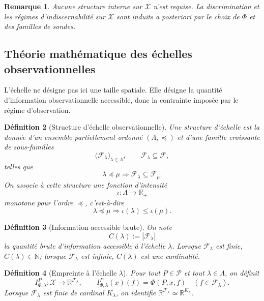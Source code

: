 \documentclass[11pt,a4paper,openany]{book}
\newtheorem{definition}{Définition}[chapter]
\newtheorem{remark}[definition]{Remarque}
\begin{document}
\begin{remark}
Aucune structure interne sur \(\mathcal X\) n'est requise. La discrimination et les régimes d'indiscernabilité sur \(\mathcal X\) sont induits a posteriori par le choix de \(\Phi\) et des familles de sondes.
\end{remark}

\subsection{Théorie mathématique des échelles observationnelles}

L'échelle ne désigne pas ici une taille spatiale. Elle désigne la quantité d'information observationnelle accessible, donc la contrainte imposée par le régime d'observation.

\begin{definition}[Structure d'échelle observationnelle]
Une \emph{structure d'échelle} est la donnée d'un ensemble partiellement ordonné \((\Lambda,\preceq)\) et d'une famille croissante de sous-familles
\[
\bigl(\mathcal F_\lambda\bigr)_{\lambda\in\Lambda},
\qquad
\mathcal F_\lambda\subseteq \mathcal F,
\]
telles que
\[
\lambda\preceq\mu \Longrightarrow \mathcal F_\lambda\subseteq \mathcal F_\mu.
\]
On associe à cette structure une fonction d'intensité
\[
\iota:\Lambda\longrightarrow \mathbb R_+
\]
monotone pour l'ordre \(\preceq\), c'est-à-dire
\[
\lambda\preceq\mu \Longrightarrow \iota(\lambda)\le \iota(\mu).
\]
\end{definition}

\begin{definition}[Information accessible brute]
On note
\[
C(\lambda):=|\mathcal F_\lambda|
\]
la quantité brute d'information accessible à l'échelle \(\lambda\). Lorsque \(\mathcal F_\lambda\) est finie, \(C(\lambda)\in\mathbb N\); lorsque \(\mathcal F_\lambda\) est infinie, \(C(\lambda)\) est une cardinalité.
\end{definition}

\begin{definition}[Empreinte à l'échelle \(\lambda\)]
Pour tout \(P\in\mathcal P\) et tout \(\lambda\in\Lambda\), on définit
\[
I_{\Phi,\lambda}^P:\mathcal X\longrightarrow \mathbb R^{\mathcal F_\lambda},
\qquad
I_{\Phi,\lambda}^P(x)(f)=\Phi(P,x,f)\quad(f\in\mathcal F_\lambda).
\]
Lorsque \(\mathcal F_\lambda\) est finie de cardinal \(K_\lambda\), on identifie \(\mathbb R^{\mathcal F_\lambda}\simeq \mathbb R^{K_\lambda}\).
\end{definition}
\end{document}
